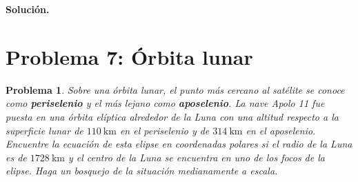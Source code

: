 \documentclass[11pt]{article}
\theoremstyle{prismstyle}
\newtheorem{problem}{Problema}
\newenvironment{solution}[1][Solución]
  {\par\textbf{#1.}\ }
  {\par}
\newcommand{\problemsection}[2]{
  \section{#1}
  \begin{problem}
  #2
  \end{problem}
}
\begin{document}
\begin{solution}
\begin{center}
\shorthandoff{<>}
\shorthandon{<>}
\end{center}
\end{solution}

\problemsection{Problema 7: Órbita lunar}{
Sobre una órbita lunar, el punto más cercano al satélite se conoce como \textbf{periselenio} y el más lejano como \textbf{aposelenio}. La nave Apolo 11 fue puesta en una órbita elíptica alrededor de la Luna con una altitud respecto a la superficie lunar de $110\ \text{km}$ en el periselenio y de $314\ \text{km}$ en el aposelenio. Encuentre la ecuación de esta elipse en coordenadas polares si el radio de la Luna es de $1728\ \text{km}$ y el centro de la Luna se encuentra en uno de los focos de la elipse. Haga un bosquejo de la situación medianamente a escala.
}
\end{document}
